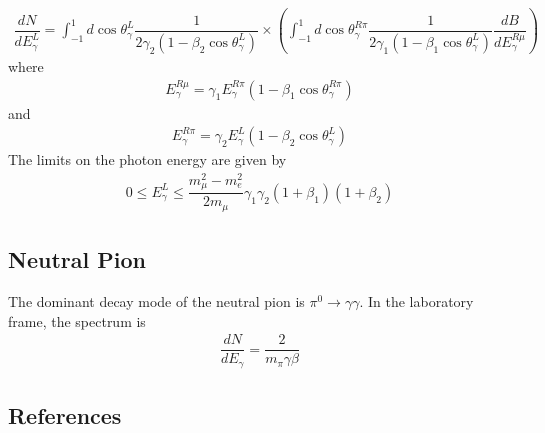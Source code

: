 \documentclass[letterpaper,10pt,english]{sphinxmanual}
\begin{document}
\begin{equation*}
\begin{split}\dfrac{dN}{dE_{\gamma}^{L}} = \int_{-1}^{1} d\cos\theta_{\gamma}^{L} \dfrac{1}{2\gamma_{2}(1-\beta_{2}\cos\theta_{\gamma}^{L})} \times
\left(\int_{-1}^{1}d\cos\theta_{\gamma}^{R\pi}
\dfrac{1}{2\gamma_{1}(1-\beta_{1}\cos\theta_{\gamma}^{L})}
\dfrac{dB}{dE_{\gamma}^{R\mu}}
\right)\end{split}
\end{equation*}
where
\begin{equation*}
\begin{split}E_{\gamma}^{R\mu} = \gamma_{1} E_{\gamma}^{R\pi}\left(1 - \beta_{1}\cos\theta_{\gamma}^{R\pi}\right)\end{split}
\end{equation*}
and
\begin{equation*}
\begin{split}E_{\gamma}^{R\pi} = \gamma_{2} E_{\gamma}^{L}\left(1 - \beta_{2}\cos\theta_{\gamma}^{L}\right)\end{split}
\end{equation*}
The limits on the photon energy are given by
\begin{equation*}
\begin{split}0 \leq E_{\gamma}^{L} \leq \dfrac{m_{\mu}^2 - m_{e}^2}{2m_{\mu}}
\gamma_{1}\gamma_{2}(1+\beta_{1})(1+\beta_{2})\end{split}
\end{equation*}


\subsection{Neutral Pion}
\label{\detokenize{Description:neutral-pion}}
The dominant decay mode of the neutral pion is \(\pi^{0}\to\gamma\gamma\). In the laboratory frame, the spectrum is
\begin{equation*}
\begin{split}\dfrac{dN}{dE_{\gamma}} = \dfrac{2}{m_{\pi}\gamma\beta}\end{split}
\end{equation*}

\subsection{References}
\label{\detokenize{Description:references}}
\end{document}

